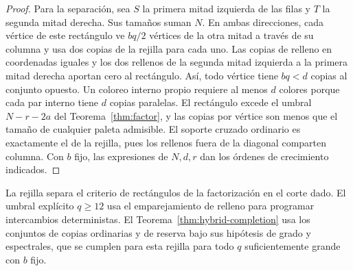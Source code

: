\begin{proof}
Para la separación, sea \(S\) la primera mitad izquierda de las filas y \(T\) la segunda mitad derecha. Sus tamaños suman \(N\). En ambas direcciones, cada vértice de este rectángulo ve \(bq/2\) vértices de la otra mitad a través de su columna y usa dos copias de la rejilla para cada uno. Las copias de relleno en coordenadas iguales y los dos rellenos de la segunda mitad izquierda a la primera mitad derecha aportan cero al rectángulo. Así, todo vértice tiene \(bq<d\) copias al conjunto opuesto. Un coloreo interno propio requiere al menos \(d\) colores porque cada par interno tiene \(d\) copias paralelas. El rectángulo excede el umbral \(N-r-2a\) del Teorema~\ref{thm:factor}, y las copias por vértice son menos que el tamaño de cualquier paleta admisible. El soporte cruzado ordinario es exactamente el de la rejilla, pues los rellenos fuera de la diagonal comparten columna. Con \(b\) fijo, las expresiones de \(N,d,r\) dan los órdenes de crecimiento indicados.
\end{proof}

La rejilla separa el criterio de rectángulos de la factorización en el corte dado. El umbral explícito \(q\ge12\) usa el emparejamiento de relleno para programar intercambios deterministas. El Teorema~\ref{thm:hybrid-completion} usa los conjuntos de copias ordinarias y de reserva bajo sus hipótesis de grado y espectrales, que se cumplen para esta rejilla para todo \(q\) suficientemente grande con \(b\) fijo.
